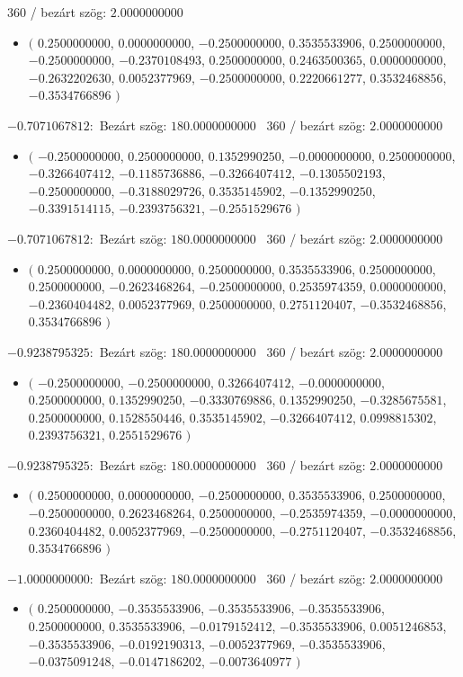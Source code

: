 \documentclass[14pt,a4paper]{article}
\begin{document}
360 / bezárt szög: $2.0000000000$\
\begin{itemize}
\item
$\big($
$0.2500000000$, $0.0000000000$, $-0.2500000000$, $0.3535533906$, $0.2500000000$, $-0.2500000000$, $-0.2370108493$, $0.2500000000$, $0.2463500365$, $0.0000000000$, $-0.2632202630$, $0.0052377969$, $-0.2500000000$, $0.2220661277$, $0.3532468856$, $-0.3534766896$
$\big)$
\end{itemize}
$-0.7071067812$:\
Bezárt szög: $180.0000000000$ \
360 / bezárt szög: $2.0000000000$\
\begin{itemize}
\item
$\big($
$-0.2500000000$, $0.2500000000$, $0.1352990250$, $-0.0000000000$, $0.2500000000$, $-0.3266407412$, $-0.1185736886$, $-0.3266407412$, $-0.1305502193$, $-0.2500000000$, $-0.3188029726$, $0.3535145902$, $-0.1352990250$, $-0.3391514115$, $-0.2393756321$, $-0.2551529676$
$\big)$
\end{itemize}
$-0.7071067812$:\
Bezárt szög: $180.0000000000$ \
360 / bezárt szög: $2.0000000000$\
\begin{itemize}
\item
$\big($
$0.2500000000$, $0.0000000000$, $0.2500000000$, $0.3535533906$, $0.2500000000$, $0.2500000000$, $-0.2623468264$, $-0.2500000000$, $0.2535974359$, $0.0000000000$, $-0.2360404482$, $0.0052377969$, $0.2500000000$, $0.2751120407$, $-0.3532468856$, $0.3534766896$
$\big)$
\end{itemize}
$-0.9238795325$:\
Bezárt szög: $180.0000000000$ \
360 / bezárt szög: $2.0000000000$\
\begin{itemize}
\item
$\big($
$-0.2500000000$, $-0.2500000000$, $0.3266407412$, $-0.0000000000$, $0.2500000000$, $0.1352990250$, $-0.3330769886$, $0.1352990250$, $-0.3285675581$, $0.2500000000$, $0.1528550446$, $0.3535145902$, $-0.3266407412$, $0.0998815302$, $0.2393756321$, $0.2551529676$
$\big)$
\end{itemize}
$-0.9238795325$:\
Bezárt szög: $180.0000000000$ \
360 / bezárt szög: $2.0000000000$\
\begin{itemize}
\item
$\big($
$0.2500000000$, $0.0000000000$, $-0.2500000000$, $0.3535533906$, $0.2500000000$, $-0.2500000000$, $0.2623468264$, $0.2500000000$, $-0.2535974359$, $-0.0000000000$, $0.2360404482$, $0.0052377969$, $-0.2500000000$, $-0.2751120407$, $-0.3532468856$, $0.3534766896$
$\big)$
\end{itemize}
$-1.0000000000$:\
Bezárt szög: $180.0000000000$ \
360 / bezárt szög: $2.0000000000$\
\begin{itemize}
\item
$\big($
$0.2500000000$, $-0.3535533906$, $-0.3535533906$, $-0.3535533906$, $0.2500000000$, $0.3535533906$, $-0.0179152412$, $-0.3535533906$, $0.0051246853$, $-0.3535533906$, $-0.0192190313$, $-0.0052377969$, $-0.3535533906$, $-0.0375091248$, $-0.0147186202$, $-0.0073640977$
$\big)$
\end{itemize}
\end{document}
